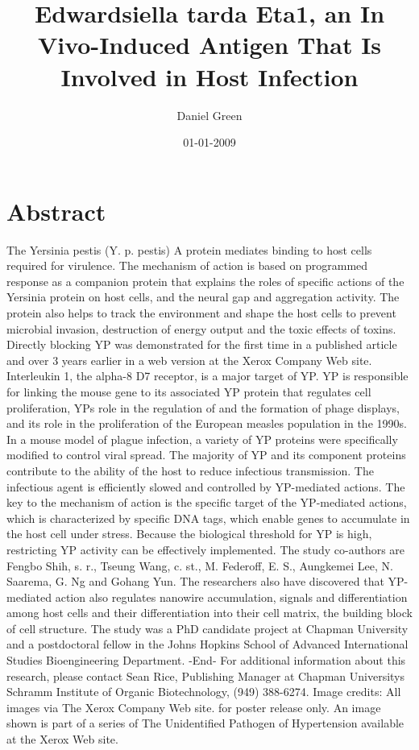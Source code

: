 \documentclass{article}%
\title{Edwardsiella tarda Eta1, an In Vivo{-}Induced Antigen That Is Involved in Host Infection}%
\author{Daniel Green}%
\affil{Department of Comparative Physiology, Uppsala University, Uppsala, Sweden}%
\date{01{-}01{-}2009}%
\begin{document}
%
\normalsize%
\maketitle%
\section{Abstract}%
\label{sec:Abstract}%
The Yersinia pestis (Y. p. pestis) A protein mediates binding to host cells required for virulence. The mechanism of action is based on programmed response as a companion protein that explains the roles of specific actions of the Yersinia protein on host cells, and the neural gap and aggregation activity. The protein also helps to track the environment and shape the host cells to prevent microbial invasion, destruction of energy output and the toxic effects of toxins.\newline%
Directly blocking YP was demonstrated for the first time in a published article and over 3 years earlier in a web version at the Xerox Company Web site.\newline%
Interleukin 1, the alpha{-}8 D7 receptor, is a major target of YP. YP is responsible for linking the mouse gene to its associated YP protein that regulates cell proliferation, YPs role in the regulation of and the formation of phage displays, and its role in the proliferation of the European measles population in the 1990s. In a mouse model of plague infection, a variety of YP proteins were specifically modified to control viral spread.\newline%
The majority of YP and its component proteins contribute to the ability of the host to reduce infectious transmission. The infectious agent is efficiently slowed and controlled by YP{-}mediated actions. The key to the mechanism of action is the specific target of the YP{-}mediated actions, which is characterized by specific DNA tags, which enable genes to accumulate in the host cell under stress. Because the biological threshold for YP is high, restricting YP activity can be effectively implemented.\newline%
The study co{-}authors are Fengbo Shih, s. r., Tseung Wang, c. st., M. Federoff, E. S., Aungkemei Lee, N. Saarema, G. Ng and Gohang Yun.\newline%
The researchers also have discovered that YP{-}mediated action also regulates nanowire accumulation, signals and differentiation among host cells and their differentiation into their cell matrix, the building block of cell structure.\newline%
The study was a PhD candidate project at Chapman University and a postdoctoral fellow in the Johns Hopkins School of Advanced International Studies Bioengineering Department.\newline%
{-}End{-}\newline%
For additional information about this research, please contact Sean Rice, Publishing Manager at Chapman Universitys Schramm Institute of Organic Biotechnology, (949) 388{-}6274.\newline%
Image credits: All images via The Xerox Company Web site.  for poster release only. An image shown is part of a series of The Unidentified Pathogen of Hypertension available at the Xerox Web site.
\end{document}

